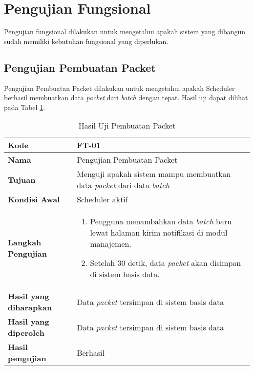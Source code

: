 \section{Pengujian Fungsional}
\par Pengujian fungsional dilakukan untuk mengetahui apakah sistem yang dibangun sudah memiliki kebutuhan fungsional yang diperlukan.

\subsection{Pengujian Pembuatan Packet}
\par Pengujian Pembuatan Packet dilakukan untuk mengetahui apakah Scheduler berhasil membuatkan data \textit{packet} dari \textit{batch} dengan tepat. Hasil uji dapat dilihat pada Tabel \ref{t:uji_pembuatan_packet}.
\begin{longtable}{|p{3cm}|p{6.5cm}|}
	\caption{Hasil Uji Pembuatan Packet} \label{t:uji_pembuatan_packet} \\ \hline
	\textbf{Kode} & FT-01 \\ \hline
	\textbf{Nama} & Pengujian Pembuatan Packet \\ \hline
	\textbf{Tujuan} & Menguji apakah sistem mampu membuatkan data \textit{packet} dari data \textit{batch} \\ \hline
	\textbf{Kondisi Awal} & Scheduler aktif \\ \hline
	\textbf{Langkah Pengujian} &  
	\begin{enumerate}
		\item Pengguna menambahkan data \textit{batch} baru lewat halaman kirim notifikasi di modul manajemen.
		\item Setelah 30 detik, data \textit{packet} akan disimpan di sistem basis data.
	\end{enumerate} \\ \hline
	\textbf{Hasil yang diharapkan} & Data \textit{packet} tersimpan di sistem basis data \\ \hline
	\textbf{Hasil yang diperoleh} & Data \textit{packet} tersimpan di sistem basis data \\ \hline
	\textbf{Hasil pengujian} & Berhasil \\ \hline
\end{longtable}

